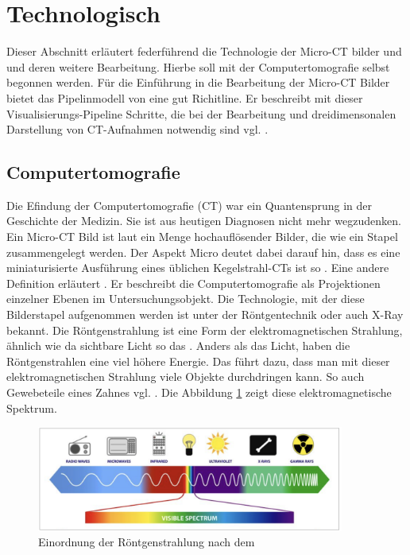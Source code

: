 \section{Technologisch}
\label{sec:technologisch} Dieser Abschnitt erläutert federführend die Technologie
der Micro-CT bilder und und deren weitere Bearbeitung. Hierbe soll mit der
Computertomografie selbst begonnen werden. Für die Einführung in die Bearbeitung
der Micro-CT Bilder bietet das Pipelinmodell von \citet[Seite 50]{handels2000} eine
gut Richitline. Er beschreibt mit dieser Visualisierungs-Pipeline Schritte, die bei
der Bearbeitung und dreidimensonalen Darstellung von CT-Aufnahmen notwendig sind
vgl. \citep[Seite 50]{handels2000}.

\subsection{Computertomografie}
\label{subsec:computertomografie} Die Efindung der Computertomografie (CT) war
ein Quantensprung in der Geschichte der Medizin. Sie ist aus heutigen Diagnosen nicht
mehr wegzudenken. Ein Micro-CT Bild ist laut \citet[Abstract]{baird2017} ein
Menge hochauflösender Bilder, die wie ein Stapel zusammengelegt werden. Der
Aspekt Micro deutet dabei darauf hin, dass es eine miniaturisierte Ausführung eines
üblichen Kegelstrahl-CTs ist so \citet[Seite 340]{buzug2011}. Eine andere
Definition erläutert \citet{lehmann2013bildverarbeitung}. Er beschreibt die
Computertomografie als Projektionen einzelner Ebenen im Untersuchungsobjekt. Die
Technologie, mit der diese Bilderstapel aufgenommen werden ist unter der
Röntgentechnik oder auch X-Ray bekannt. Die Röntgenstrahlung ist eine Form der elektromagnetischen
Strahlung, ähnlich wie da sichtbare Licht so das \citet{nib2024}. Anders als das
Licht, haben die Röntgenstrahlen eine viel höhere Energie. Das führt dazu, dass man
mit dieser elektromagnetischen Strahlung viele Objekte durchdringen kann. So
auch Gewebeteile eines Zahnes vgl. \citep{nib2024}. Die Abbildung \ref{fig:spectrum}
zeigt diese elektromagnetische Spektrum.

\begin{figure}[h]
	\centering
	\includegraphics[width=0.9\textwidth]{img/spectrum.jpg}
	\caption{Einordnung der Röntgenstrahlung nach dem \citet{nib2024}}
	\label{fig:spectrum}
\end{figure}

